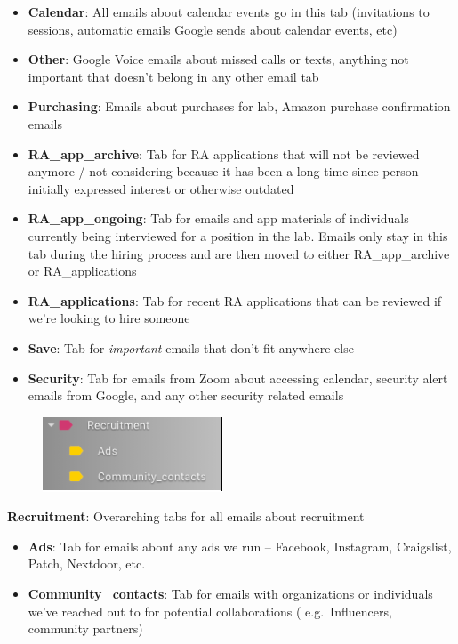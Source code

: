 \documentclass[]{book}
\begin{document}
\begin{itemize}
\item
  \textbf{Calendar}: All emails about calendar events go in this tab (invitations to sessions, automatic emails Google sends about calendar events, etc)
\item
  \textbf{Other}: Google Voice emails about missed calls or texts, anything not important that doesn't belong in any other email tab
\item
  \textbf{Purchasing}: Emails about purchases for lab, Amazon purchase confirmation emails
\item
  \textbf{RA\_app\_archive}: Tab for RA applications that will not be reviewed anymore / not considering because it has been a long time since person initially expressed interest or otherwise outdated
\item
  \textbf{RA\_app\_ongoing}: Tab for emails and app materials of individuals currently being interviewed for a position in the lab. Emails only stay in this tab during the hiring process and are then moved to either RA\_app\_archive or RA\_applications
\item
  \textbf{RA\_applications}: Tab for recent RA applications that can be reviewed if we're looking to hire someone
\item
  \textbf{Save}: Tab for \emph{important} emails that don't fit anywhere else
\item
  \textbf{Security}: Tab for emails from Zoom about accessing calendar, security alert emails from Google, and any other security related emails
\end{itemize}

\begin{figure}
\centering
\includegraphics{images/lab_protocols/gmail/gmail_2.png}
\caption{}
\end{figure}

\textbf{Recruitment}: Overarching tabs for all emails about recruitment

\begin{itemize}
\item
  \textbf{Ads}: Tab for emails about any ads we run -- Facebook, Instagram, Craigslist, Patch, Nextdoor, etc.
\item
  \textbf{Community\_contacts}: Tab for emails with organizations or individuals we've reached out to for potential collaborations ( e.g.~Influencers, community partners)
\end{itemize}
\end{document}
